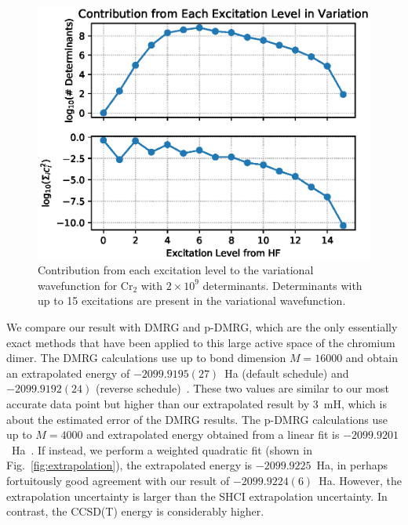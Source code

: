 \documentclass[%
reprint,
 superscriptaddress,
 amsmath,amssymb,
 aps,
]{revtex4-1}
\begin{document}
\begin{figure}
  \includegraphics[width=\linewidth]{excitation/excitation.eps}
  \caption{Contribution from each excitation level to the variational wavefunction for Cr$_2$ with $2 \times 10^9$ determinants.
  Determinants with up to 15 excitations are present in the variational wavefunction.
}
  \label{fig:excit}
\end{figure}

We compare our result with DMRG and p-DMRG, which are the only essentially exact methods that have been applied to this large active space of the chromium dimer.
The DMRG calculations use up to bond dimension $M=16000$ and obtain an extrapolated energy of $-2099.9195(27)$~Ha (default schedule) and $-2099.9192(24)$ (reverse schedule)~\cite{GuoLiCha-JCTC-18}.
These two values are similar to our most accurate data point but higher than our extrapolated result by 3~mH, which is about the estimated error of the DMRG results.
The p-DMRG calculations use up to $M=4000$ and extrapolated energy obtained from a linear fit is $-2099.9201$~Ha~\cite{GuoLiCha-JCTC-18}.
If instead, we perform a weighted quadratic fit (shown in Fig.~\ref{fig:extrapolation}), the extrapolated energy is $-2099.9225$~Ha,
in perhaps fortuitously good agreement with our result of $-2099.9224(6)$~Ha.  However, the extrapolation uncertainty is larger than the SHCI extrapolation uncertainty.
In contrast, the CCSD(T) energy is considerably higher.
\end{document}
